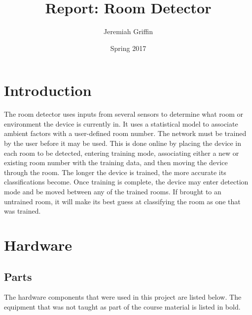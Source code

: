 \documentclass{article}
\title{Report: Room Detector}
\author{Jeremiah Griffin}
\date{Spring 2017}
\begin{document}
\maketitle
\newpage

\tableofcontents
\listoffigures
\listoftables
\newpage


\section{Introduction}

The room detector uses inputs from several sensors to determine what
room or environment the device is currently in.  It uses a statistical
model to associate ambient factors with a user-defined room number.  The
network must be trained by the user before it may be used.  This is done
online by placing the device in each room to be detected, entering
training mode, associating either a new or existing room number with the
training data, and then moving the device through the room.  The longer
the device is trained, the more accurate its classifications become.
Once training is complete, the device may enter detection mode and be
moved between any of the trained rooms.  If brought to an untrained
room, it will make its best guess at classifying the room as one that
was trained.


\section{Hardware}

\subsection{Parts}

The hardware components that were used in this project are listed below.
The equipment that was not taught as part of the course material is
listed in bold.
\end{document}
